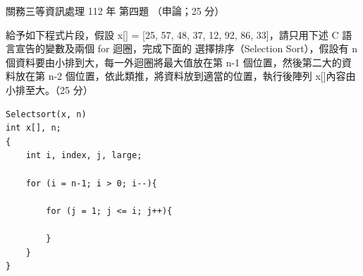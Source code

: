 \begin{pastexam}[label={px:gw3-112-ds-04}]{關務三等資訊處理 112 年 第四題}
（申論；25 分）

給予如下程式片段，假設 x[] = [25, 57, 48, 37, 12, 92, 86, 33]，請只用下述 C 語言宣告的變數及兩個 for 迴圈，完成下面的
選擇排序（Selection Sort），假設有 n 個資料要由小排到大，每一外迴圈將最大值放在第 n-1 個位置，然後第二大的資料放在第
n-2 個位置，依此類推，將資料放到適當的位置，執行後陣列 x[]內容由小排至大。（25 分）
\begin{verbatim}
Selectsort(x, n)
int x[], n;
{
    int i, index, j, large;

    for (i = n-1; i > 0; i--){

        for (j = 1; j <= i; j++){

        }
    }
}
\end{verbatim}
\end{pastexam}

